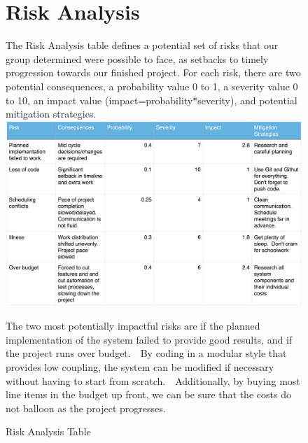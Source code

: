 \begin{figure}
\chapter{Risk Analysis}
The Risk Analysis table defines a potential set of risks that our group determined were possible to face, as setbacks to timely progression towards our finished project. For each risk, there are two potential consequences, a probability value 0 to 1, a severity value 0 to 10, an impact value (impact=probability*severity), and potential mitigation strategies.
\newline
\includegraphics[width=1\textwidth]{images/risk.png}
\caption{Risk Analysis Table}
\par The two most potentially impactful risks are if the planned implementation of the system failed to provide good results, and if the project runs over budget.  By coding in a modular style that provides low coupling, the system can be modified if necessary without having to start from scratch.  Additionally, by buying most line items in the budget up front, we can be sure that the costs do not balloon as the project progresses.
\end{figure}
